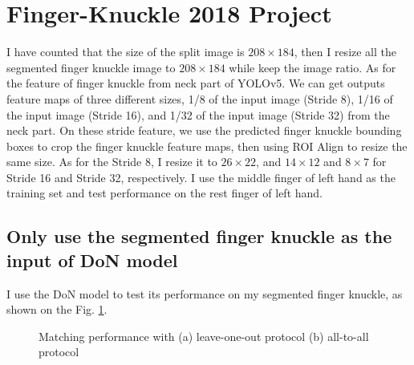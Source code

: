 
\section{Finger-Knuckle 2018 Project}

I have counted that the size of the split image is $208\times184$, then I resize all the segmented finger knuckle image to $208\times184$ while keep the image ratio. As for the feature of finger knuckle from neck part of YOLOv5. We can get outputs feature maps of three different sizes, 1/8 of the input image (Stride 8), 1/16 of the input image (Stride 16), and 1/32 of the input image (Stride 32) from the neck part. On these stride feature, we use the predicted finger knuckle bounding boxes to crop the finger knuckle feature maps, then using ROI Align to resize the same size. As for the Stride 8, I resize it to $26\times22$, and $14\times12$ and $8\times7$ for Stride 16 and Stride 32, respectively. I use the middle finger of left hand as the training set and test performance on the rest finger of left hand.


\subsection{Only use the segmented finger knuckle as the input of DoN 
model}
I use the DoN model to test its performance on my segmented finger knuckle, as shown on the Fig. \ref{don-roc}.

\begin{figure}[h]
    \centering

    \caption{Matching performance with (a) leave-one-out protocol (b) all-to-all protocol}
    \label{don-roc}
\end{figure}




